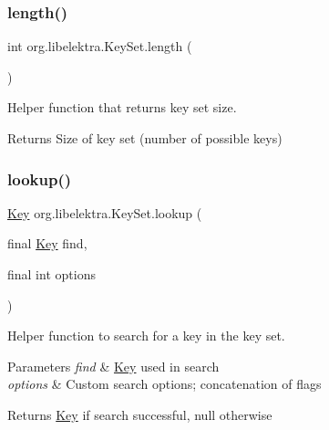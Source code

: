 \subsubsection{\texorpdfstring{length()}{length()}}
{\footnotesize\ttfamily int org.\+libelektra.\+Key\+Set.\+length (\begin{DoxyParamCaption}{ }\end{DoxyParamCaption})\hspace{0.3cm}{\ttfamily [inline]}}



Helper function that returns key set size. 

\begin{DoxyReturn}{Returns}
Size of key set (number of possible keys) 
\end{DoxyReturn}
\mbox{\label{classorg_1_1libelektra_1_1KeySet_a6fb319a768b1cb43464154a93f9a2e93}} 
\subsubsection{\texorpdfstring{lookup()}{lookup()}\hspace{0.1cm}{\footnotesize\ttfamily [1/4]}}
{\footnotesize\ttfamily \hyperlink{classorg_1_1libelektra_1_1Key}{Key} org.\+libelektra.\+Key\+Set.\+lookup (\begin{DoxyParamCaption}\item[{final \hyperlink{classorg_1_1libelektra_1_1Key}{Key}}]{find,  }\item[{final int}]{options }\end{DoxyParamCaption})\hspace{0.3cm}{\ttfamily [inline]}}



Helper function to search for a key in the key set. 


\begin{DoxyParams}{Parameters}
{\em find} & \hyperlink{classorg_1_1libelektra_1_1Key}{Key} used in search \\
\hline
{\em options} & Custom search options; concatenation of flags \\
\hline
\end{DoxyParams}
\begin{DoxyReturn}{Returns}
\hyperlink{classorg_1_1libelektra_1_1Key}{Key} if search successful, null otherwise 
\end{DoxyReturn}
\mbox{\label{classorg_1_1libelektra_1_1KeySet_a9ff1d475fd6ae316515c4c1cc173991b}} 
